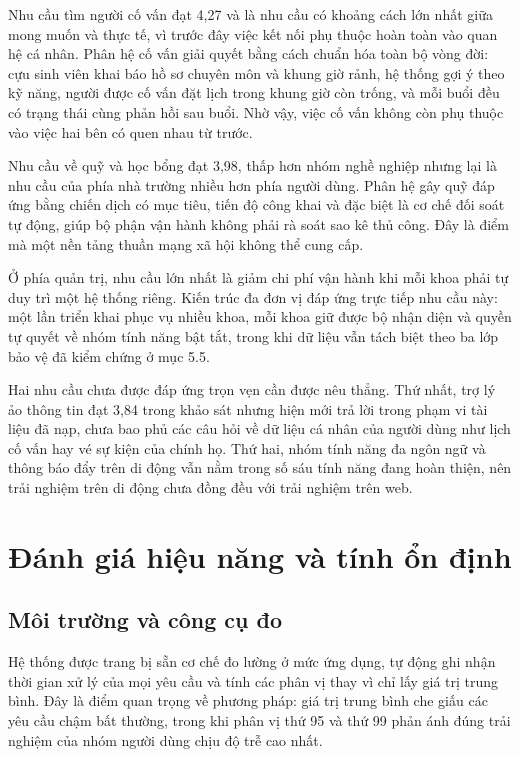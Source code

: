 \documentclass[12pt,a4paper,oneside]{report}
\begin{document}
Nhu cầu tìm người cố vấn đạt 4,27 và là nhu cầu có khoảng cách lớn nhất giữa mong muốn và thực tế, vì trước đây việc kết nối phụ thuộc hoàn toàn vào quan hệ cá nhân. Phân hệ cố vấn giải quyết bằng cách chuẩn hóa toàn bộ vòng đời: cựu sinh viên khai báo hồ sơ chuyên môn và khung giờ rảnh, hệ thống gợi ý theo kỹ năng, người được cố vấn đặt lịch trong khung giờ còn trống, và mỗi buổi đều có trạng thái cùng phản hồi sau buổi. Nhờ vậy, việc cố vấn không còn phụ thuộc vào việc hai bên có quen nhau từ trước.

Nhu cầu về quỹ và học bổng đạt 3,98, thấp hơn nhóm nghề nghiệp nhưng lại là nhu cầu của phía nhà trường nhiều hơn phía người dùng. Phân hệ gây quỹ đáp ứng bằng chiến dịch có mục tiêu, tiến độ công khai và đặc biệt là cơ chế đối soát tự động, giúp bộ phận vận hành không phải rà soát sao kê thủ công. Đây là điểm mà một nền tảng thuần mạng xã hội không thể cung cấp.

Ở phía quản trị, nhu cầu lớn nhất là giảm chi phí vận hành khi mỗi khoa phải tự duy trì một hệ thống riêng. Kiến trúc đa đơn vị đáp ứng trực tiếp nhu cầu này: một lần triển khai phục vụ nhiều khoa, mỗi khoa giữ được bộ nhận diện và quyền tự quyết về nhóm tính năng bật tắt, trong khi dữ liệu vẫn tách biệt theo ba lớp bảo vệ đã kiểm chứng ở mục 5.5.

Hai nhu cầu chưa được đáp ứng trọn vẹn cần được nêu thẳng. Thứ nhất, trợ lý ảo thông tin đạt 3,84 trong khảo sát nhưng hiện mới trả lời trong phạm vi tài liệu đã nạp, chưa bao phủ các câu hỏi về dữ liệu cá nhân của người dùng như lịch cố vấn hay vé sự kiện của chính họ. Thứ hai, nhóm tính năng đa ngôn ngữ và thông báo đẩy trên di động vẫn nằm trong số sáu tính năng đang hoàn thiện, nên trải nghiệm trên di động chưa đồng đều với trải nghiệm trên web.

\section{Đánh giá hiệu năng và tính ổn định}

\subsection{Môi trường và công cụ đo}

Hệ thống được trang bị sẵn cơ chế đo lường ở mức ứng dụng, tự động ghi nhận thời gian xử lý của mọi yêu cầu và tính các phân vị thay vì chỉ lấy giá trị trung bình. Đây là điểm quan trọng về phương pháp: giá trị trung bình che giấu các yêu cầu chậm bất thường, trong khi phân vị thứ 95 và thứ 99 phản ánh đúng trải nghiệm của nhóm người dùng chịu độ trễ cao nhất.
\end{document}
